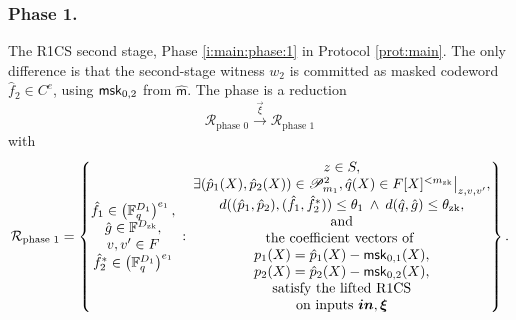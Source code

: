 \subsubsection{Phase 1.}
The R1CS second stage, Phase \ref{i:main:phase:1} in Protocol \ref{prot:main}. 
The only difference is that the second-stage witness $w_2$ is committed as masked codeword $\hat f_2\in C^{e}$, using $\mathsf{msk}_{0,2}$ from $\hat{\mathsf m}$.
The phase is a reduction
\[
\mathcal R_\text{phase 0} \stackrel{\vec\xi}{\longrightarrow} \mathcal R_\text{phase 1}
\]
with %
\begin{equation}
\label{e:}
\mathcal R_\text{phase 1} 
=
\left\{
    \begin{matrix}
        \hat f_1 \in \left(\mathbb F_q^{D_1}\right)^{e_1},
        \\
        \hat g \in \mathbb F^{D_\text{zk}},
        \\
        v, v' \in F
        \\
        \hat f_2^* \in \left(\mathbb F_q^{D_1}\right)^{e_1}%
    \end{matrix}
    \::\:
    \begin{matrix}
        z\in S,
        \\
        \exists (\hat p_1(X),\hat p_2(X)) \in \mathscr P_{m_1}^2, 
        \hat q(X) \in F[X]^{< m_\text{zk}}\big|_{z,v,v'},
        \\
        d((\hat p_1, \hat p_2), (\hat f_1,\hat f_2^*)) \leq \theta_1
        \:\wedge \: 
        d(\hat q, \hat g)\leq \theta_\text{zk},
        \\
        \text{and}
        \\
        \text{the coefficient vectors of }
        \\
        p_1(X) = \hat p_1(X) - \msk_{0,1}(X), \\ p_2(X) = \hat p_2(X) - \msk_{0,2}(X),
        \\
        \text{ satisfy the lifted R1CS }
        \\
        \text{on inputs }\vec{in} , \vec\xi 
    \end{matrix}
\right\}.
\end{equation}



